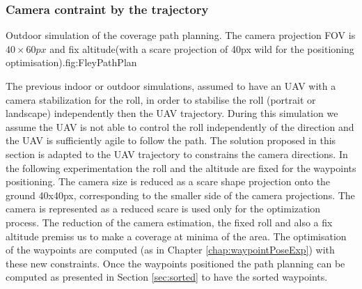  \subsubsection{Camera contraint by the trajectory} \label{sec:holonomie path}
  \begin{mfigures}[!]{Outdoor simulation of the coverage path planning. The camera projection FOV is $40 \times 60 px$  and fix altitude(with  a scare projection of 40px wild for the positioning optimisation).}{fig:FleyPathPlan} \centering
\hspace{1cm}
\tabsimuposeFleyPathHolonom
\end{mfigures} 

The previous indoor or outdoor simulations, assumed to have an UAV with a camera stabilization for the roll, in order to stabilise the roll (portrait or landscape) independently then the UAV trajectory.
During this simulation we assume the UAV is not able to control the roll independently of the direction and the UAV is sufficiently agile to follow the path.
The solution proposed in this section is adapted to the UAV trajectory to constrains the camera directions. 
In the following experimentation the roll and the altitude are fixed for the waypoints positioning. The camera size is reduced as a scare shape projection onto the ground 40x40px, corresponding to the smaller side of the camera projections. The camera is represented as a reduced scare is used only for the optimization process.
 The reduction of the camera estimation, the fixed roll and also a fix altitude premiss us to make a coverage at minima of the area.
The optimisation of the waypoints are computed (as in Chapter \ref{chap:waypointPoseExp}) with these new constraints. Once the waypoints positioned  
the path planning can be computed as presented in Section \ref{sec:sorted} to have the sorted waypoints.

